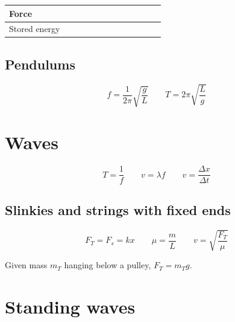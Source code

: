 \begin{tabular}{|>{\RaggedRight}p{0.38225\linewidth}|>{\RaggedRight}p{0.23286\linewidth}|>{\RaggedRight}p{0.23286\linewidth}|}
	\\ \hline \hspace*{0pt}\ignorespaces{}\hspace*{0pt}Force&\hspace*{0pt}\ignorespaces{}\hspace*{0pt}{${\displaystyle F_{\mathrm {eq} }=F_{1}=F_{2}}$}&\hspace*{0pt}\ignorespaces{}\hspace*{0pt}{${\displaystyle F_{\mathrm {eq} }=F_{1}+F_{2}}$}
	\\ \hline \hspace*{0pt}\ignorespaces{}\hspace*{0pt}Stored energy&\hspace*{0pt}\ignorespaces{}\hspace*{0pt}{${\displaystyle E_{\mathrm {eq} }=E_{1}+E_{2}}$}&\hspace*{0pt}\ignorespaces{}\hspace*{0pt}{${\displaystyle E_{\mathrm {eq} }=E_{1}+E_{2}}$}\\ \hline 
\end{tabular}

\subsection{Pendulums}

\[
	f = \frac{1}{2\pi}\sqrt{\frac{g}{L}} \qquad 
	T = 2\pi \sqrt{\frac{L}{g}}
\]

\section{Waves}

\[
	T = \frac{1}{f} \qquad
	v = \lambda f \qquad
	v = \frac{\Delta x}{\Delta t}
\]

\subsection{Slinkies and strings with fixed ends}

\[
	F_T = F_s = kx \qquad
	\mu = \frac{m}{L} \qquad
	v = \sqrt{\frac{F_T}{\mu}}
\]

Given mass $m_T$ hanging below a pulley, $F_T = m_T g$.


\section{Standing waves}

